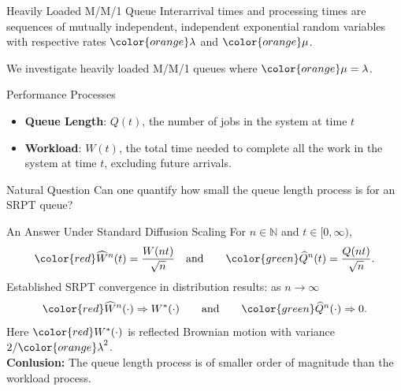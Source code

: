 \documentclass[16pt]{beamer}
\begin{document}
\begin{frame}
\begin{textblock}{35}
\begin{block}{\huge Heavily Loaded M/M/1 Queue}
Interarrival times and processing times are sequences of mutually independent, independent exponential random variables with respective rates ${\color{orange}\lambda}$ and ${\color{orange}\mu}$. 

 We investigate heavily loaded M/M/1 queues where ${\color{orange}\mu=\lambda}$.
\vspace{\baselineskip}
\end{block}

\begin{block}{\huge Performance Processes}
\begin{itemize}
\item \textbf{Queue Length}: {\color{green}$Q(t)$}, the number of jobs in the system at time $t$
\item \textbf{Workload}: {\color{red}$W(t)$}, the total time needed to complete all the work in the system at time $t$, excluding future arrivals.
\end{itemize}
\vspace{\baselineskip}
\end{block}

\begin{block}{\huge Natural Question}
Can one quantify how small the queue length process is for an SRPT queue?
\vspace{\baselineskip}
\end{block}

\begin{block}{\huge An Answer Under Standard Diffusion Scaling}
For $n\in{\mathbb N}$ and $t \in [0,\infty)$,
\[
{\color{red}\widehat{W}^{n}(t) = \frac{W(nt)}{\sqrt{n}}}
\quad\hbox{and}\qquad
{\color{green}\widehat{Q}^{n}(t) = \frac{Q(nt) } {\sqrt{n}}}.
\]
\vspace{\baselineskip}
Established SRPT convergence in distribution results: as $n\to\infty$
\[
{\color{red}\widehat{W}^{n}(\cdot)\Rightarrow W^*(\cdot)}
\qquad\hbox{and}\qquad
{\color{green}\widehat{Q}^{n}(\cdot)\Rightarrow 0}.
\]
Here  ${\color{red}W^{*}(\cdot)}$ is reflected Brownian motion with variance $2/{\color{orange}\lambda}^2$.\\

{\bf Conlusion:} The queue length process is of smaller order of magnitude than the workload process.
\vspace{\baselineskip}
\end{block}


\end{textblock}
\end{frame}
\end{document}
